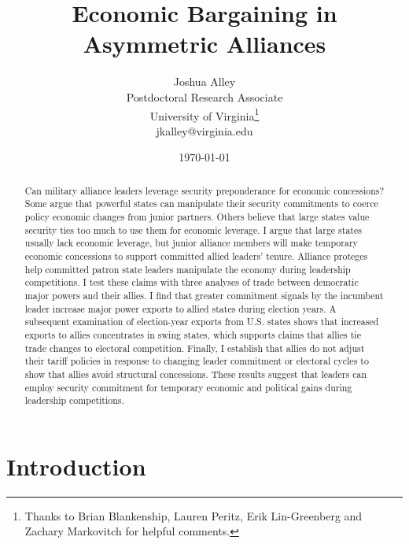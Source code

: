 \documentclass[12pt]{article}
\title{\textbf{Economic Bargaining in Asymmetric Alliances}}
\author{Joshua Alley \\
Postdoctoral Research Associate \\
University of Virginia\thanks{Thanks to Brian Blankenship, Lauren Peritz, Erik Lin-Greenberg and Zachary Markovitch for helpful comments.} \\
jkalley@virginia.edu
}
\date{\today}
\begin{document}
\maketitle 

\begin{abstract}
Can military alliance leaders leverage security preponderance for economic concessions?
Some argue that powerful states can manipulate their security commitments to coerce policy economic changes from junior partners. 
Others believe that large states value security ties too much to use them for economic leverage.  
I argue that large states usually lack economic leverage, but junior alliance members will make temporary economic concessions to support committed allied leaders' tenure.
Alliance proteges help committed patron state leaders manipulate the economy during leadership competitions.  
I test these claims with three analyses of trade between democratic major powers and their allies. 
I find that greater commitment signals by the incumbent leader increase major power exports to allied states during election years. 
A subsequent examination of election-year exports from U.S. states shows that increased exports to allies concentrates in swing states, which supports claims that allies tie trade changes to electoral competition.
Finally, I establish that allies do not adjust their tariff policies in response to changing leader commitment or electoral cycles to show that allies avoid structural concessions. 
These results suggest that leaders can employ security commitment for temporary economic and political gains during leadership competitions. 
\end{abstract} 


\newpage 
\doublespace 


\section{Introduction}
\end{document}
